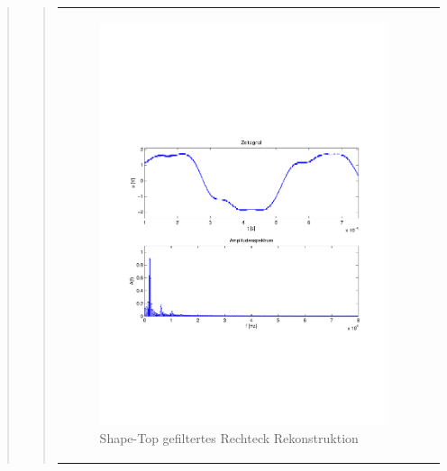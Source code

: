 \begin{quote}
\begin{quote}
\begin{center}
\begin{tabular}{ll}
                \begin{minipage}{0.6\textwidth}
                    \begin{figure}[H]
                        \includegraphics[scale=0.55, trim = 16mm 70mm 16mm 85mm, clip]{Bilder/shaperecFil20_05}
                       \caption{Shape-Top gefiltertes Rechteck Rekonstruktion}
		              \label{fig:shaperecFil20_05}
                    \end{figure}
                \end{minipage}
            
            \end{tabular}
            \end{center}
            
            \vspace{2em}
            

\end{quote}
\end{quote}
